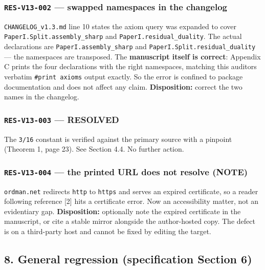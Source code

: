 \documentclass[
  9pt,
  a4paper,
]{article}
\begin{document}
\subsubsection{\texorpdfstring{\texttt{RES-V13-002} --- swapped
namespaces in the
changelog}{RES-V13-002 --- swapped namespaces in the changelog}}\label{res-v13-002--swapped-namespaces-in-the-changelog}

\texttt{CHANGELOG\_v1.3.md} line 10 states the axiom query was expanded
to cover \texttt{PaperI.Split.assembly\_sharp} and
\texttt{PaperI.residual\_duality}. The actual declarations are
\texttt{PaperI.assembly\_sharp} and
\texttt{PaperI.Split.residual\_duality} --- the namespaces are
transposed. The \textbf{manuscript itself is correct}: Appendix C prints
the four declarations with the right namespaces, matching this
auditor\textquotesingle s verbatim \texttt{\#print\ axioms} output
exactly. So the error is confined to package documentation and does not
affect any claim. \textbf{Disposition:} correct the two names in the
changelog.

\subsubsection{\texorpdfstring{\texttt{RES-V13-003} ---
RESOLVED}{RES-V13-003 --- RESOLVED}}\label{res-v13-003--resolved}

The \texttt{3/16} constant is verified against the primary source with a
pinpoint (Theorem 1, page 23). See Section 4.4. No further action.

\subsubsection{\texorpdfstring{\texttt{RES-V13-004} --- the printed URL
does not resolve
(NOTE)}{RES-V13-004 --- the printed URL does not resolve (NOTE)}}\label{res-v13-004--the-printed-url-does-not-resolve-note}

\texttt{ordman.net} redirects \texttt{http} to \texttt{https} and serves
an expired certificate, so a reader following reference {[}2{]} hits a
certificate error. Now an accessibility matter, not an evidentiary gap.
\textbf{Disposition:} optionally note the expired certificate in the
manuscript, or cite a stable mirror alongside the author-hosted copy.
The defect is on a third-party host and cannot be fixed by editing the
target.

\subsection{8. General regression (specification Section
6)}\label{8-general-regression-specification-section-6}
\end{document}
